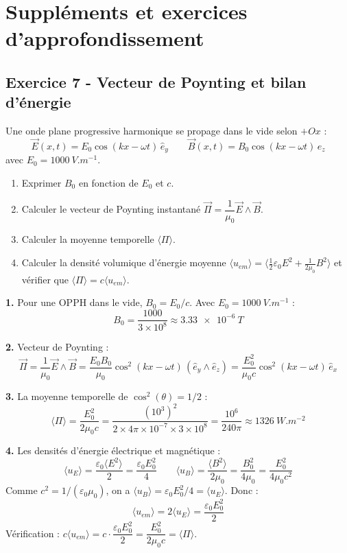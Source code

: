 \documentclass[12pt,a4paper]{article}
\begin{document}
\section{Suppléments et exercices d'approfondissement}

\subsection*{Exercice 7 - Vecteur de Poynting et bilan d'énergie \niveau{\moyen}}

\begin{boiteexercice}
Une onde plane progressive harmonique se propage dans le vide selon $+Ox$ :
\[
\vec{E}(x,t) = E_0\cos(kx-\omega t)\,\hat{e}_y \qquad \vec{B}(x,t) = B_0\cos(kx-\omega t)\,\hat{e}_z
\]
avec $E_0 = \qty{1000}{V.m^{-1}}$.
\begin{enumerate}
  \item Exprimer $B_0$ en fonction de $E_0$ et $c$.
  \item Calculer le vecteur de Poynting instantané $\vec{\Pi} = \dfrac{1}{\mu_0}\vec{E}\wedge\vec{B}$.
  \item Calculer la moyenne temporelle $\langle\Pi\rangle$.
  \item Calculer la densité volumique d'énergie moyenne $\langle u_{em}\rangle = \langle\frac{1}{2}\varepsilon_0 E^2 + \frac{1}{2\mu_0}B^2\rangle$ et vérifier que $\langle\Pi\rangle = c\langle u_{em}\rangle$.
\end{enumerate}
\end{boiteexercice}

\begin{boitecorrige}
\textbf{1.} Pour une OPPH dans le vide, $B_0 = E_0/c$. Avec $E_0 = \qty{1000}{V.m^{-1}}$ :
\[
B_0 = \frac{1000}{3\times10^8} \approx \qty{3.33e-6}{T}
\]

\textbf{2.} Vecteur de Poynting :
\[
\vec{\Pi} = \frac{1}{\mu_0}\vec{E}\wedge\vec{B} = \frac{E_0B_0}{\mu_0}\cos^2(kx-\omega t)\,(\hat{e}_y\wedge\hat{e}_z) = \frac{E_0^2}{\mu_0 c}\cos^2(kx-\omega t)\,\hat{e}_x
\]

\textbf{3.} La moyenne temporelle de $\cos^2(\theta) = 1/2$ :
\[
\langle\Pi\rangle = \frac{E_0^2}{2\mu_0 c} = \frac{(10^3)^2}{2\times4\pi\times10^{-7}\times3\times10^8} = \frac{10^6}{240\pi} \approx \qty{1326}{W.m^{-2}}
\]

\textbf{4.} Les densités d'énergie électrique et magnétique :
\[
\langle u_E\rangle = \frac{\varepsilon_0\langle E^2\rangle}{2} = \frac{\varepsilon_0 E_0^2}{4} \qquad \langle u_B\rangle = \frac{\langle B^2\rangle}{2\mu_0} = \frac{B_0^2}{4\mu_0} = \frac{E_0^2}{4\mu_0 c^2}
\]
Comme $c^2 = 1/(\varepsilon_0\mu_0)$, on a $\langle u_B\rangle = \varepsilon_0 E_0^2/4 = \langle u_E\rangle$. Donc :
\[
\langle u_{em}\rangle = 2\langle u_E\rangle = \frac{\varepsilon_0 E_0^2}{2}
\]
Vérification : $c\langle u_{em}\rangle = c\cdot\dfrac{\varepsilon_0 E_0^2}{2} = \dfrac{E_0^2}{2\mu_0 c} = \langle\Pi\rangle$.
\end{boitecorrige}
\end{document}
